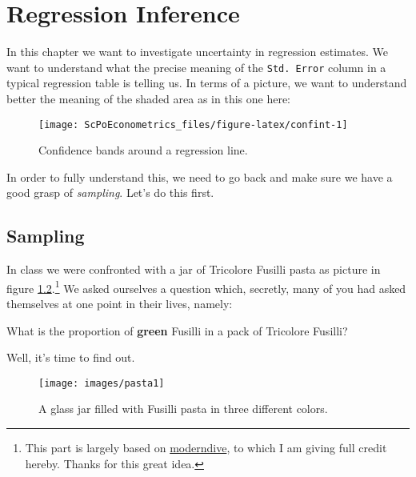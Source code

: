 \documentclass[]{book}
\newenvironment{tip}{\begin{tcolorbox}[colback=green!5!white,colframe=green]}{\end{tcolorbox}}
\begin{document}
\hypertarget{std-errors}{%
\chapter{Regression Inference}\label{std-errors}}

In this chapter we want to investigate uncertainty in regression estimates. We want to understand what the precise meaning of the \texttt{Std.\ Error} column in a typical regression table is telling us. In terms of a picture, we want to understand better the meaning of the shaded area as in this one here:

\begin{figure}

{\centering \texttt{[image: ScPoEconometrics\_files/figure-latex/confint-1]} 

}

\caption{Confidence bands around a regression line.}\label{fig:confint}
\end{figure}

In order to fully understand this, we need to go back and make sure we have a good grasp of \emph{sampling}. Let's do this first.

\hypertarget{sampling}{%
\section{Sampling}\label{sampling}}

In class we were confronted with a jar of Tricolore Fusilli pasta as picture in figure \ref{fig:pasta1}.\footnote{This part is largely based on \href{https://moderndive.com/7-sampling.html}{moderndive}, to which I am giving full credit hereby. Thanks for this great idea.} We asked ourselves a question which, secretly, many of you had asked themselves at one point in their lives, namely:

\begin{tip}
What is the proportion of \textbf{green} Fusilli in a pack of Tricolore
Fusilli?
\end{tip}

Well, it's time to find out.

\begin{figure}

{\centering \texttt{[image: images/pasta1]} 

}

\caption{A glass jar filled with Fusilli pasta in three different colors.}\label{fig:pasta1}
\end{figure}
\end{document}
